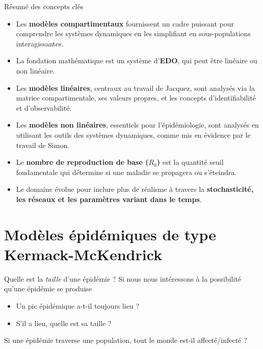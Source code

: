\documentclass[aspectratio=169]{beamer}\usepackage[]{graphicx}\usepackage[]{xcolor}
\begin{document}
\begin{frame}{Résumé des concepts clés}
    \begin{itemize}
        \item Les \textbf{modèles compartimentaux} fournissent un cadre puissant pour comprendre les systèmes dynamiques en les simplifiant en sous-populations interagissantes.
        \item La fondation mathématique est un système d'\textbf{EDO}, qui peut être linéaire ou non linéaire.
        \item Les \textbf{modèles linéaires}, centraux au travail de Jacquez, sont analysés via la matrice compartimentale, ses valeurs propres, et les concepts d'identifiabilité et d'observabilité.
        \item Les \textbf{modèles non linéaires}, essentiels pour l'épidémiologie, sont analysés en utilisant les outils des systèmes dynamiques, comme mis en évidence par le travail de Simon.
        \item Le \textbf{nombre de reproduction de base ($R_0$)} est la quantité seuil fondamentale qui détermine si une maladie se propagera ou s'éteindra.
        \item Le domaine évolue pour inclure plus de réalisme à travers la \textbf{stochasticité, les réseaux et les paramètres variant dans le temps}.
    \end{itemize}
\end{frame}

\section{Modèles épidémiques de type Kermack-McKendrick}

\nocite{KermackMcKendrick1927}

\begin{frame}{Quelle est la \emph{taille} d'une épidémie ?}
\bbullet 
Si nous nous intéressons à la possibilité qu'une épidémie se produise
\begin{itemize}
  \item Un pic épidémique a-t-il toujours lieu ?
  \item S'il a lieu, quelle est sa taille ?
\end{itemize}
\vfill
\bbullet Si une épidémie traverse une population, tout le monde est-il affecté/infecté ?
\end{frame}
\end{document}
